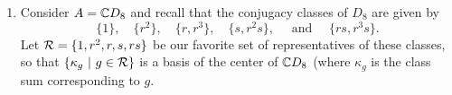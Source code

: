 \documentclass[11pt, reqno]{amsart}
\theoremstyle{plain}
\theoremstyle{definition}
\theoremstyle{example}
\def\id{\mathrm{id}}
\begin{document}
\begin{enumerate}[1.]
\begin{proof}
Now let us define,
\begin{align*}
\varphi_1: &M \to M\\
&m \mapsto z_1 m
\end{align*}

and 
\begin{align*}
\varphi_2: &M \to M\\
&m \mapsto z_2 m
\end{align*}

Then we have,
\begin{align*}
(\varphi_1 + \varphi_2)(m) &= z_1 m + z_2 m\\
&= (z_1 + z_2) m\\
&= (\frac{1}{2}(1+x) + \frac{1}{2}(1-x)) m\\
&= (\frac{1}{2} + \frac{1}{2} x + \frac{1}{2} - \frac{1}{2}x) m\\
&= (1)m\\
&= m
\end{align*}

Hence, $\varphi_1 + \varphi_2$ maps $m \mapsto m$ and so $\varphi_1 + \varphi_2 = \id_M$. Moreover,

\begin{align*}
\varphi_1 \varphi_2 &= z_1 m z_2 m\\
&= z_1 z_2 m m\\
&= 0
\end{align*}

Similarly,
\begin{align*}
\varphi_2 \varphi_1 = 0
\end{align*}

\end{proof}

\item Consider $A = \mathbb{C} D_8$ and recall that the conjugacy classes of $D_8$ are given by 
$$\{1\}, \quad \{r^2\}, \quad \{r, r^3\}, \quad \{s, r^2 s\}, \quad \text{ and } \quad \{rs, r^3s\}.$$
Let $\mathcal{R} = \{1, r^2, r, s, rs\}$ be our favorite set of representatives of these classes, so that $\{\kappa_g~|~ g \in \mathcal{R}\}$ is a basis of the center of $\mathbb{C} D_8$ (where $\kappa_g$ is the class sum corresponding to $g$.


\end{enumerate}
\end{document}
